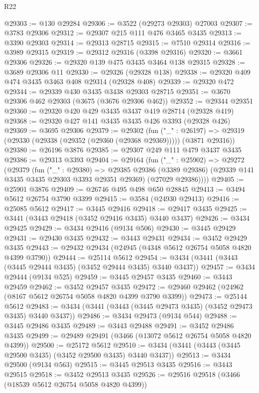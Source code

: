 \begin{lexlean}{R22}
\begin{coremodule}
@29303 := @130 @29284
@29306 := @3522 (@29273 @29303) @27003
@29307 := @3783 @29306
@29312 := @29307 @215 @111 @476 @3465 @3435
@29313 := @3390 @29303
@29314 := @29313 @28715
@29315 := @7510 @29314
@29316 := @3989 @29315
@29319 := @29312 @29316 (@3398 @29316)
@29320 := @3661 @29306
@29326 := @29320 @139 @475 @3435 @3464 @138 @29315
@29328 := @3689 @29306 @11
@29330 := @29326 (@29328 @138)
@29338 := @29320 @409 @474 @3435 @3463 @408 @29314 (@29328 @408)
@29339 := @29320 @472
@29344 := @29339 @430 @3435 @3438 @29303 @28715
@29351 := @3670 @29306 @462 @29303 (@3675 (@3676 @29306 @462))
@29352 := @29344 @29351
@29360 := @29320 @420 @429 @3435 @3437 @419 @28714 (@29328 @419)
@29368 := @29320 @427 @141 @3435 @3435 @426 @3393 (@29328 @426)
@29369 := @3695 @29306
@29379 := @29302
    (fun ("_" : @26197) =>
    @29319 (@29330 (@29338 (@29352 (@29360 (@29368 @29369))))) (@3871 @29316))
@29380 := @26196 @3876
@29385 := @29307 @249 @111 @479 @3437 @3435
@29386 := @29313 @3393
@29404 := @29164
    (fun ("_" : @25902) =>
    @29272
      (@29379
        (fun ("_" : @29380) =>
        @29385
          @29386
          (@3389 @29386)
          (@29339 @141 @3435 @3435 @29303 @3393 @29351 @29369)
          (@27029 @29386))))
@29405 := @25901 @3876
@29409 := @26746 @495 @498 @650 @28845
@29413 := @3494 @5612 @26754 @3790 @3399
@29415 := @3584 (@24930 @29413)
@29416 := @25085 @5612
@29417 := @3445 @29416
@29418 := @29417 @3435
@29425 := @3441 (@3443 @29418 (@3452 @29416 @3435) @3440 @3437)
@29426 := @3434 @29425
@29429 := @3434 @29416 (@9134 @506)
@29430 := @3445 @29429
@29431 := @29430 @3435
@29432 := @3443 @29431
@29434 := @3452 @29429 @3435
@29443 := @29432 @29434 (@24945 (@4348 @5612 @26754 @5058 @4820 @4399 @3790))
@29444 := @25114 @5612
@29454 := @3434 (@3441 (@3443 (@3445 @29444 @3435) (@3452 @29444 @3435) @3440 @3437))
@29457 := @3434 @29444 (@9134 @525)
@29459 := @3445 @29457 @3435
@29460 := @3443 @29459
@29462 := @3452 @29457 @3435
@29472 := @29460 @29462 (@24962 (@8167 @5612 @26754 @5058 @4820 @4399 @3790 @3399))
@29473 := @25144 @5612
@29483 := @3434 (@3441 (@3443 (@3445 @29473 @3435) (@3452 @29473 @3435) @3440 @3437))
@29486 := @3434 @29473 (@9134 @544)
@29488 := @3445 @29486 @3435
@29489 := @3443 @29488
@29491 := @3452 @29486 @3435
@29499 := @29489 @29491 (@3466 (@13072 @5612 @26754 @5058 @4820 @4399))
@29500 := @25172 @5612
@29510 := @3434 (@3441 (@3443 (@3445 @29500 @3435) (@3452 @29500 @3435) @3440 @3437))
@29513 := @3434 @29500 (@9134 @563)
@29515 := @3445 @29513 @3435
@29516 := @3443 @29515
@29518 := @3452 @29513 @3435
@29526 := @29516 @29518 (@3466 (@18539 @5612 @26754 @5058 @4820 @4399))

\end{coremodule}
\end{lexlean}
